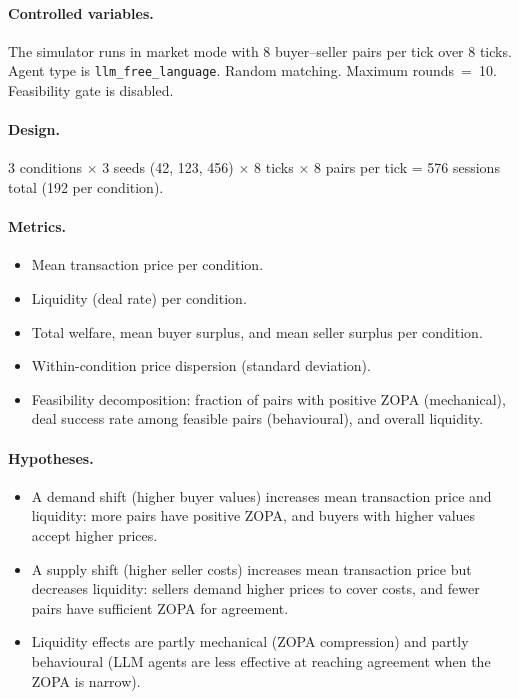 \paragraph{Controlled variables.}
The simulator runs in market mode with 8 buyer--seller pairs per tick over 8 ticks.  Agent type is \texttt{llm\_free\_language}.  Random matching.  Maximum rounds~=~10.  Feasibility gate is disabled.

\paragraph{Design.}
3 conditions $\times$ 3 seeds (42, 123, 456) $\times$ 8 ticks $\times$ 8 pairs per tick = 576 sessions total (192 per condition).

\paragraph{Metrics.}
\begin{itemize}
    \item Mean transaction price per condition.
    \item Liquidity (deal rate) per condition.
    \item Total welfare, mean buyer surplus, and mean seller surplus per condition.
    \item Within-condition price dispersion (standard deviation).
    \item Feasibility decomposition: fraction of pairs with positive ZOPA (mechanical), deal success rate among feasible pairs (behavioural), and overall liquidity.
\end{itemize}

\paragraph{Hypotheses.}
\begin{itemize}
    \item[\textbf{H-6a.}] A demand shift (higher buyer values) increases mean transaction price and liquidity: more pairs have positive ZOPA, and buyers with higher values accept higher prices.
    \item[\textbf{H-6b.}] A supply shift (higher seller costs) increases mean transaction price but decreases liquidity: sellers demand higher prices to cover costs, and fewer pairs have sufficient ZOPA for agreement.
    \item[\textbf{H-6c.}] Liquidity effects are partly mechanical (ZOPA compression) and partly behavioural (LLM agents are less effective at reaching agreement when the ZOPA is narrow).
\end{itemize}

